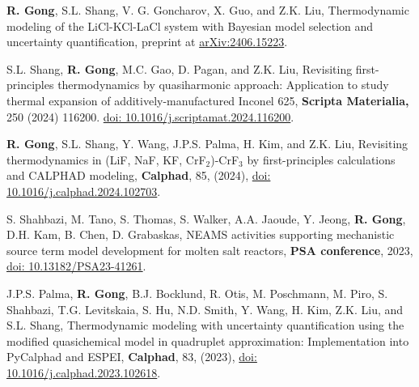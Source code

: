 
\begin{etaremune}


\item \textbf{R. Gong}, S.L. Shang, V. G. Goncharov, X. Guo, and Z.K. Liu, Thermodynamic modeling of the LiCl-KCl-LaCl system with Bayesian model selection and uncertainty quantification, preprint at
\href{https://arxiv.org/abs/2406.15223}{arXiv:2406.15223}.

\item S.L. Shang, \textbf{R. Gong}, M.C. Gao, D. Pagan, and Z.K. Liu,
Revisiting first-principles thermodynamics by quasiharmonic approach: Application to study thermal expansion of additively-manufactured Inconel 625,
\textbf{Scripta Materialia,} 250 (2024) 116200.
\href{https://doi.org/10.1016/j.scriptamat.2024.116200}{doi: 10.1016/j.scriptamat.2024.116200}.

\item \textbf{R. Gong}, S.L. Shang, Y. Wang, J.P.S. Palma, H. Kim, and Z.K. Liu, 
Revisiting thermodynamics in (LiF, NaF, KF, CrF$_2$)-CrF$_3$ by first-principles calculations and CALPHAD modeling,
\textbf{Calphad}, 85, (2024),
\href{https://doi.org/10.1016/j.calphad.2024.102703}{doi: 10.1016/j.calphad.2024.102703}.

\item S. Shahbazi, M. Tano, S. Thomas, S. Walker, A.A. Jaoude, Y. Jeong, \textbf{R. Gong}, D.H. Kam, B. Chen, D. Grabaskas,
NEAMS activities supporting mechanistic source term model development for molten salt reactors,
\textbf{PSA conference}, 2023,
\href{https://doi.org/10.13182/PSA23-41261}{doi: 10.13182/PSA23-41261}.

\item J.P.S. Palma, \textbf{R. Gong}, B.J. Bocklund, R. Otis, M. Poschmann, M. Piro, S. Shahbazi, T.G. Levitskaia, S. Hu,  N.D. Smith, Y. Wang, H. Kim, Z.K. Liu, and S.L. Shang, 
Thermodynamic modeling with uncertainty quantification using the modified quasichemical model in quadruplet approximation: Implementation into PyCalphad and ESPEI,  
\textbf{Calphad}, 83, (2023),
\href{https://doi.org/10.1016/j.calphad.2023.102618}{doi: 10.1016/j.calphad.2023.102618}.


\end{etaremune}
